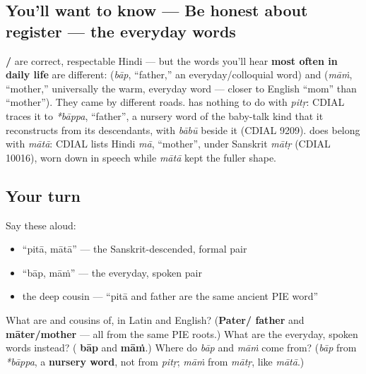 \subsection*{You'll want to know — Be honest about register — the everyday words}
\textbf{/} are correct, respectable Hindi — but the words you'll hear \textbf{most often in daily life} are different: \textbf{} (\emph{bāp}, \textquotedblleft{}father,\textquotedblright{} an everyday/colloquial word) and \textbf{} (\emph{māṁ}, \textquotedblleft{}mother,\textquotedblright{} universally the warm, everyday word — closer to English \textquotedblleft{}mom\textquotedblright{} than \textquotedblleft{}mother\textquotedblright{}). They came by different roads. \textbf{} has nothing to do with \emph{pitṛ}: CDIAL traces it to \emph{*bāppa}, \textquotedblleft{}father\textquotedblright{}, a nursery word of the baby-talk kind that it reconstructs from its descendants, with \emph{bābū} beside it (CDIAL 9209). \textbf{} does belong with \emph{mātā}: CDIAL lists Hindi \emph{mā}, \textquotedblleft{}mother\textquotedblright{}, under Sanskrit \emph{mātṛ} (CDIAL 10016), worn down in speech while \emph{mātā} kept the fuller shape.

\subsection*{Your turn}
Say these aloud:

\begin{itemize}
\raggedright
  \item \textquotedblleft{}pitā, mātā\textquotedblright{} — the Sanskrit-descended, formal pair
  \item \textquotedblleft{}bāp, māṁ\textquotedblright{} — the everyday, spoken pair
  \item the deep cousin — \textquotedblleft{}pitā and father are the same ancient PIE word\textquotedblright{}
\end{itemize}

\begin{tcolorbox}[breakable,colback=teal!4,colframe=teal!35!black,title={Before you move on}]
What are  and  cousins of, in Latin and English? (\textbf{Pater/ father} and \textbf{māter/mother} — all from the same PIE roots.) What are the everyday, spoken words instead? (\textbf{ bāp} and \textbf{ māṁ}.) Where do \emph{bāp} and \emph{māṁ} come from? (\emph{bāp} from \emph{*bāppa}, a \textbf{nursery word}, not from \emph{pitṛ}; \emph{māṁ} from \emph{mātṛ}, like \emph{mātā}.)
\end{tcolorbox}
